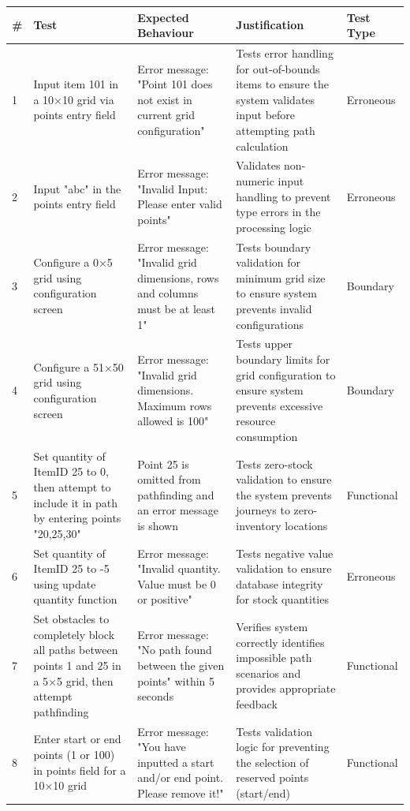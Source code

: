 \begin{longtable}{|p{}|p{}|p{}|p{}|p{}|}
	\hline
	\textbf{\#} & \textbf{Test} & \textbf{Expected Behaviour} & \textbf{Justification} & \textbf{Test Type} \\
	\hline
	\endhead
	
	1 & Input item 101 in a 10×10 grid via points entry field & Error message: "Point 101 does not exist in current grid configuration" & Tests error handling for out-of-bounds items to ensure the system validates input before attempting path calculation & Erroneous \\
	\hline
	2 & Input "abc" in the points entry field & Error message: "Invalid Input: Please enter valid points" & Validates non-numeric input handling to prevent type errors in the processing logic & Erroneous \\
	\hline
	3 & Configure a 0×5 grid using configuration screen & Error message: "Invalid grid dimensions, rows and columns must be at least 1" & Tests boundary validation for minimum grid size to ensure system prevents invalid configurations & Boundary \\
	\hline
	4 & Configure a 51×50 grid using configuration screen & Error message: "Invalid grid dimensions. Maximum rows allowed is 100" & Tests upper boundary limits for grid configuration to ensure system prevents excessive resource consumption & Boundary \\
	\hline
	5 & Set quantity of ItemID 25 to 0, then attempt to include it in path by entering points "20,25,30" & Point 25 is omitted from pathfinding and an error message is shown & Tests zero-stock validation to ensure the system prevents journeys to zero-inventory locations & Functional \\
	\hline
	6 & Set quantity of ItemID 25 to -5 using update quantity function & Error message: "Invalid quantity. Value must be 0 or positive" & Tests negative value validation to ensure database integrity for stock quantities & Erroneous \\
	\hline
	7 & Set obstacles to completely block all paths between points 1 and 25 in a 5×5 grid, then attempt pathfinding & Error message: "No path found between the given points" within 5 seconds & Verifies system correctly identifies impossible path scenarios and provides appropriate feedback & Functional \\
	\hline
	8 & Enter start or end points (1 or 100) in points field for a 10×10 grid & Error message: "You have inputted a start and/or end point. Please remove it!" & Tests validation logic for preventing the selection of reserved points (start/end) & Functional \\

\end{longtable}
